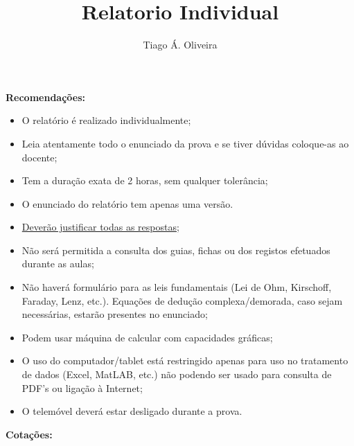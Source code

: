 \documentclass[11pt,a4paper,final,addpoints]{exam}
\author{Tiago Á. Oliveira}
\title{Relatorio Individual}
\begin{document}
\begin{center}
\end{center}

\noindent\textbf{Recomenda\c{c}\~{o}es:}
\begin{itemize}
\item O relat\'{o}rio \'{e} realizado individualmente;

\item Leia atentamente todo o enunciado da prova e se tiver d\'{u}vidas coloque-as ao docente;

\item Tem a dura\c{c}\~{a}o exata de 2 horas, sem qualquer toler\^{a}ncia;

\item O enunciado do relat\'{o}rio tem apenas uma vers\~{a}o. 

\item \underline{Dever\~{a}o justificar todas as respostas};

\item N\~{a}o ser\'{a} permitida a consulta dos guias, fichas ou dos registos efetuados durante as aulas;

\item N\~{a}o haver\'{a} formul\'{a}rio para as leis fundamentais (Lei de Ohm, Kirschoff, Faraday, Lenz, etc.). Equa\c{c}\~{o}es de dedu\c{c}\~{a}o complexa/demorada, caso sejam necess\'{a}rias, estar\~{a}o presentes no enunciado;

\item Podem usar m\' {a}quina de calcular com capacidades gr\'{a}ficas;

\item O uso do computador/tablet est\'{a} restringido apenas para uso no tratamento de dados (Excel, MatLAB, etc.) n\~{a}o podendo ser usado para consulta de PDF's ou liga\c{c}\~{a}o \`{a} Internet;

\item O telem\'{o}vel dever\'{a} estar desligado durante a prova.
\end{itemize}

\noindent\textbf{Cota\c{c}\~{o}es:}
\begin{center}
\gradetable[h][questions]
\linebreak
\end{center}
\end{document}
